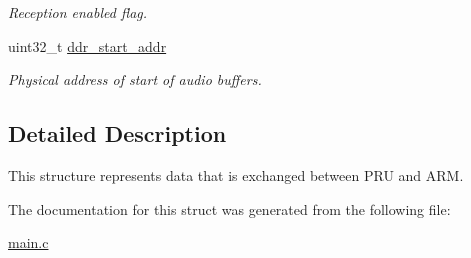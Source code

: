 \begin{DoxyCompactItemize}
\begin{DoxyCompactList}\small\item\em Reception enabled flag. \end{DoxyCompactList}\item 
\hypertarget{structrpc__msg_abe32d41193fa8f4581c872ad1f578e19}{uint32\-\_\-t \hyperlink{structrpc__msg_abe32d41193fa8f4581c872ad1f578e19}{ddr\-\_\-start\-\_\-addr}}\label{structrpc__msg_abe32d41193fa8f4581c872ad1f578e19}

\begin{DoxyCompactList}\small\item\em Physical address of start of audio buffers. \end{DoxyCompactList}\end{DoxyCompactItemize}


\subsection{Detailed Description}
This structure represents data that is exchanged between P\-R\-U and A\-R\-M. 

The documentation for this struct was generated from the following file\-:\begin{DoxyCompactItemize}
\item 
\hyperlink{main_8c}{main.\-c}\end{DoxyCompactItemize}
